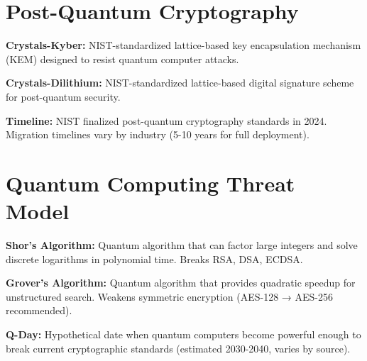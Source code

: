 \documentclass[12pt,oneside]{book}
\begin{document}
\section*{Post-Quantum Cryptography}

\textbf{Crystals-Kyber:} NIST-standardized lattice-based key encapsulation mechanism (KEM) designed to resist quantum computer attacks.

\textbf{Crystals-Dilithium:} NIST-standardized lattice-based digital signature scheme for post-quantum security.

\textbf{Timeline:} NIST finalized post-quantum cryptography standards in 2024. Migration timelines vary by industry (5-10 years for full deployment).

\section*{Quantum Computing Threat Model}

\textbf{Shor's Algorithm:} Quantum algorithm that can factor large integers and solve discrete logarithms in polynomial time. Breaks RSA, DSA, ECDSA.

\textbf{Grover's Algorithm:} Quantum algorithm that provides quadratic speedup for unstructured search. Weakens symmetric encryption (AES-128 → AES-256 recommended).

\textbf{Q-Day:} Hypothetical date when quantum computers become powerful enough to break current cryptographic standards (estimated 2030-2040, varies by source).
\end{document}
